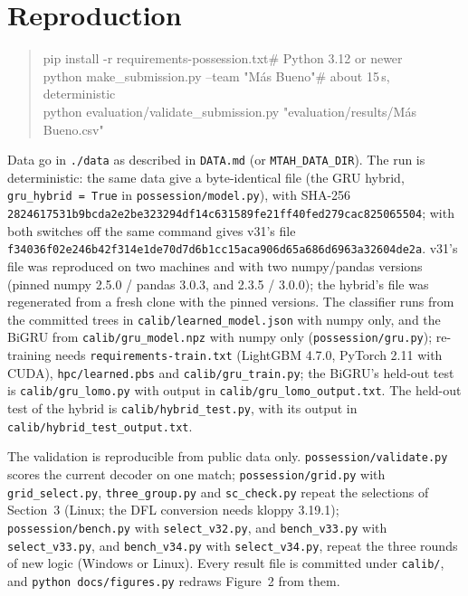 \documentclass[11pt,a4paper]{article}
\newcommand{\code}[1]{\texttt{#1}}
\begin{document}
\section{Reproduction}

\begin{quote}\small\ttfamily
pip install -r requirements-possession.txt\hfill\textrm{\color{muted}\# Python 3.12 or newer}\\
python make\_submission.py --team "Más Bueno"\hfill\textrm{\color{muted}\# about 15\,s, deterministic}\\
python evaluation/validate\_submission.py "evaluation/results/Más Bueno.csv"
\end{quote}

Data go in \code{./data} as described in \code{DATA.md} (or \code{MTAH\_DATA\_DIR}). The run is
deterministic: the same data give a byte-identical file (the GRU hybrid, \code{gru\_hybrid = True} in \code{possession/model.py}), with SHA-256\\
{\small\texttt{2824617531b9bcda2e2be323294df14c631589fe21ff40fed279cac825065504}}; with both switches off the same command gives v31's file\\
{\small\texttt{f34036f02e246b42f314e1de70d7d6b1cc15aca906d65a686d6963a32604de2a}}. v31's file was reproduced on two machines and with two numpy/pandas versions (pinned numpy
2.5.0 / pandas 3.0.3, and 2.3.5 / 3.0.0); the hybrid's file was regenerated from a fresh clone with the pinned
versions. The classifier runs from the committed trees in \code{calib/learned\_model.json} with numpy
only, and the BiGRU from \code{calib/gru\_model.npz} with numpy only (\code{possession/gru.py}); re-training
needs \code{requirements-train.txt} (LightGBM 4.7.0, PyTorch 2.11 with CUDA), \code{hpc/learned.pbs} and
\code{calib/gru\_train.py}; the BiGRU's held-out test is \code{calib/gru\_lomo.py} with output in
\code{calib/gru\_lomo\_output.txt}. The
held-out test of the hybrid is \code{calib/hybrid\_test.py}, with its output in \code{calib/hybrid\_test\_output.txt}.

The validation is reproducible from public data only. \code{possession/validate.py} scores the current
decoder on one match; \code{possession/grid.py} with \code{grid\_select.py}, \code{three\_group.py} and
\code{sc\_check.py} repeat the selections of Section~3 (Linux; the DFL conversion needs kloppy 3.19.1);
\code{possession/bench.py} with \code{select\_v32.py}, and \code{bench\_v33.py} with \code{select\_v33.py}, and \code{bench\_v34.py} with \code{select\_v34.py}, repeat the three rounds of new logic (Windows or Linux). Every
result file is committed under \code{calib/}, and \code{python docs/figures.py} redraws Figure~2 from them.
\end{document}
